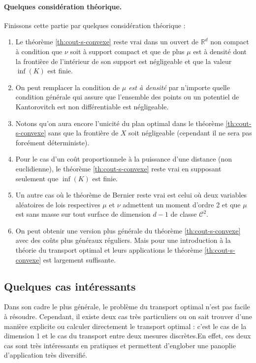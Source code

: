\documentclass[
    8.2pt,
    a4paper,
    logo,
    twocolumn
]{template}
\begin{document}
    \paragraph{Quelques considération théorique. \citep{santambrogio_optimal_2015, Notes}} Finissons cette partie par quelques considération théorique :
    \begin{enumerate}[i]
        \item Le théorème \ref{th:cout-s-convexe} reste vrai dans un ouvert de $\mathbb{R}^d$ non compact à condition que $\nu$ soit à support compact et que de plus $\mu$ est à densité dont la frontière de l’intérieur de son support est négligeable et que la valeur $\inf (K)$ est finie.
        \item On peut remplacer la condition de \textit{$\mu$ est à densité} par n’importe quelle condition générale qui assure que l’ensemble des points ou un potentiel de Kantorovitch est non différentiable est négligeable.
        \item Notons qu’on aura encore l’unicité du plan optimal dans le théorème \ref{th:cout-s-convexe} sans que la frontière de $X$ soit négligeable (cependant il ne sera pas forcément déterministe).
        \item Pour le cas d’un coût proportionnele à la puissance d’une distance (non euclidienne), le théorème \ref{th:cout-s-convexe} reste vrai en supposant seulement que $\inf (K)$ est finie.
        \item Un autre cas où le théorème de Bernier reste vrai est celui où deux variables aléatoires de lois respectives $\mu$ et $\nu$ admettent un moment d’ordre 2 et que $\mu$ est sans masse sur tout surface de dimension $d-1$ de classe $\mathcal{C}^2$.
        \item On peut obtenir une version plus générale du théorème \ref{th:cout-s-convexe} avec des coûts plus généraux réguliers. Mais pour une introduction à la théorie du transport optimal et leurs applications le théorème \ref{th:cout-s-convexe} est largement suffisante.
    \end{enumerate}

    \subsection{Quelques cas intéressants}\label{sec:deuxcas}
      Dans son cadre le plus générale, le problème du transport optimal n’est pas facile à résoudre. Cependant, il existe deux cas très particuliers ou on sait trouver d’une manière explicite ou calculer directement le transport optimal : c’est le cas de la dimension 1 et le cas du transport entre deux mesures discrètes.En effet, ces deux cas sont très intéressants en pratiques et permettent d'englober une panoplie d’application très diversifié.
\end{document}
